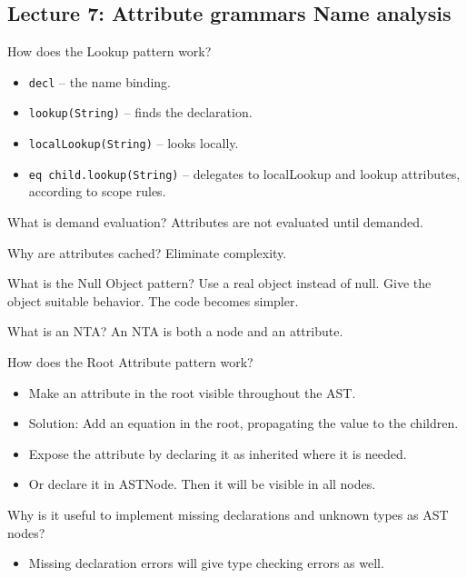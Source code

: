 \documentclass[11pt]{beamer}
\begin{document}
\subsection{Lecture 7: Attribute grammars Name analysis}
\begin{frame}


\begin{block}{How does the Lookup pattern work?}
\begin{itemize}
\item \texttt{decl} – the name binding.
\item \texttt{lookup(String)} – finds the declaration.
\item \texttt{localLookup(String)} – looks locally.
\item \texttt{eq child.lookup(String)} – delegates to localLookup and lookup attributes, according to scope rules.
\end{itemize}
\end{block}


\begin{block}{What is demand evaluation? }
Attributes are not evaluated until demanded.
\end{block}


\begin{block}{Why are attributes cached? }
Eliminate complexity.
\end{block}

\begin{block}{What is the Null Object pattern?}
Use a real object instead of null. Give the object suitable behavior. The code becomes simpler.
\end{block}


\end{frame}

\begin{frame}
\begin{block}{What is an NTA? }
An NTA is both a node and an attribute.
\end{block}

\begin{block}{How does the Root Attribute pattern work? }
\begin{itemize}
\item Make an attribute in the root visible throughout the AST.
\item Solution: Add an equation in the root, propagating the value to the children.
\item Expose the attribute by declaring it as inherited where it is needed.
\item Or declare it in ASTNode. Then it will be visible in all nodes.
\end{itemize}
\end{block}

\begin{block}{Why is it useful to implement missing declarations and unknown types as AST nodes?}
\begin{itemize}
\item Missing declaration errors will give type checking errors as well.
\end{itemize}
\end{block}


\end{frame}
\end{document}
